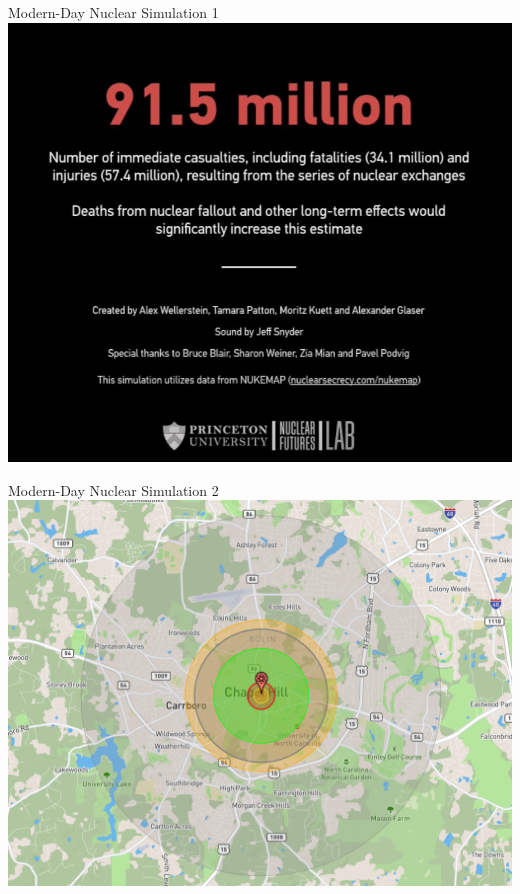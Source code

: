 \documentclass{beamer}
\begin{document}
\begin{frame}{\LARGE Modern-Day Nuclear Simulation 1}
    \centering
\includegraphics[width=\textwidth,height=0.9\textheight,keepaspectratio]{nuclear simulation.JPG}
\end{frame}

\begin{frame}{\LARGE Modern-Day Nuclear Simulation 2}
	\centering
	\includegraphics[width=\textwidth,height=0.9\textheight,keepaspectratio]{UNCnuke.png}
\end{frame}
\end{document}

